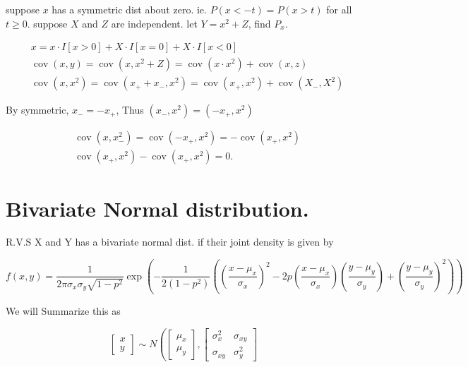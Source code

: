 \documentclass[10pt]{article}
\begin{document}
\begin{example}
suppose $x$ has a symmetric dist about zero. ie. $P(x<-t)=P(x>t)$ for all $t \geqslant 0$.
suppose $X$ and $Z$ are independent. let $Y=x^{2}+Z$, find $P_{x}$.
\end{example}

$$
\begin{aligned}
& x=x \cdot I[x>0]+X \cdot I[x=0]+X \cdot I\left[x< 0\right] \\
& \operatorname{cov}(x, y)=\operatorname{cov}\left(x, x^{2}+Z\right)=\operatorname{cov}\left(x \cdot x^{2}\right)+\operatorname{cov}(x, z) \\
& \operatorname{cov}\left(x, x^{2}\right)=\operatorname{cov}\left(x_++x_-, x^{2}\right)=\operatorname{cov}\left(x_+, x^{2}\right)+\operatorname{cov}\left(X_-, X^{2}\right)
\end{aligned}
$$

By symmetric, $x_{-}=-x_{+}$, Thus $\left(x_{-}, x^{2}\right)=\left(-x_{+}, x^{2}\right)$

$$
\begin{aligned}
& \operatorname{cov}\left(x, x_{-}^{2}\right)=\operatorname{cov}\left(-x_{+}, x^{2}\right)=-\operatorname{cov}\left(x_{+}, x^{2}\right) \\
& \operatorname{cov}\left(x_{+}, x^{2}\right)-\operatorname{cov}\left(x_{+}, x^{2}\right)=0 .
\end{aligned}
$$

\section{Bivariate Normal distribution.}

{R.V.S} X and Y has a bivariate normal dist. if their joint density is given by

$$
f(x, y)=\frac{1}{2 \pi \sigma_{x} \sigma_{y} \sqrt{1-p^{2}}} \exp \left(-\frac{1}{2 (1-p^{2}) }(\left(\frac{x-\mu_{x}}{\sigma_{x}}\right)^{2}-2 p\left(\frac{x-\mu_{x}}{\sigma_{x}}\right)\left(\frac{y-\mu_{y}}{\sigma_{y}}\right)+\left(\frac{y-\mu_{y}}{\sigma_{y}}\right)^{2})\right)
$$

We will Summarize this as

$$
\left[\begin{array}{l}
x \\
y
\end{array}\right] \sim N\left(\left[\begin{array}{l}
\mu_{x} \\
\mu_{y}
\end{array}\right],\left[\begin{array}{ll}
\sigma_{x}^{2} & \sigma_{x y} \\
\sigma_{x y} & \sigma_{y}^{2}
\end{array}\right]\right.
$$
\end{document}
